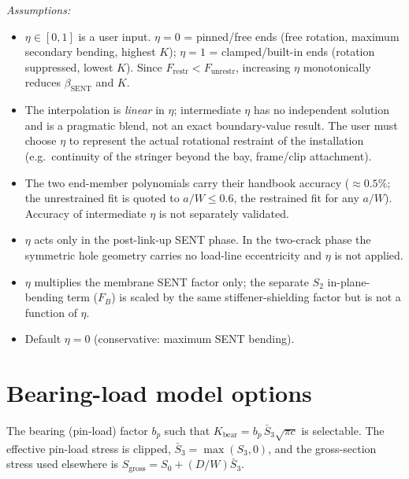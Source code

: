 \documentclass[11pt]{article}
\newenvironment{assume}{\par\smallskip\noindent\textit{Assumptions:}\begin{itemize}[leftmargin=1.5em,topsep=2pt,itemsep=1pt]}{\end{itemize}\par\smallskip}
\begin{document}
\begin{assume}
\item $\eta\in[0,1]$ is a user input. $\eta=0$ = pinned/free ends (free
  rotation, maximum secondary bending, highest $K$); $\eta=1$ =
  clamped/built-in ends (rotation suppressed, lowest $K$). Since
  $F_{\text{restr}}<F_{\text{unrestr}}$, increasing $\eta$ monotonically reduces
  $\beta_{\text{SENT}}$ and $K$.
\item The interpolation is \emph{linear} in $\eta$; intermediate $\eta$ has no
  independent solution and is a pragmatic blend, not an exact boundary-value
  result. The user must choose $\eta$ to represent the actual rotational
  restraint of the installation (e.g.\ continuity of the stringer beyond the
  bay, frame/clip attachment).
\item The two end-member polynomials carry their handbook accuracy ($\approx
  0.5\%$; the unrestrained fit is quoted to $a/W\le0.6$, the restrained fit for
  any $a/W$). Accuracy of intermediate $\eta$ is not separately validated.
\item $\eta$ acts only in the post-link-up SENT phase. In the two-crack phase
  the symmetric hole geometry carries no load-line eccentricity and $\eta$ is
  not applied.
\item $\eta$ multiplies the membrane SENT factor only; the separate $S_2$
  in-plane-bending term ($F_B$) is scaled by the same stiffener-shielding factor
  but is not a function of $\eta$.
\item Default $\eta=0$ (conservative: maximum SENT bending).
\end{assume}

\section{Bearing-load model options}
\label{sec:bearing}

The bearing (pin-load) factor $b_p$ such that $K_{\text{bear}}=b_p\,\bar
S_3\sqrt{\pi c}$ is selectable. The effective pin-load stress is clipped,
$\bar S_3=\max(S_3,0)$, and the gross-section stress used elsewhere is
$S_{\text{gross}}=S_0+(D/W)\bar S_3$.
\end{document}
